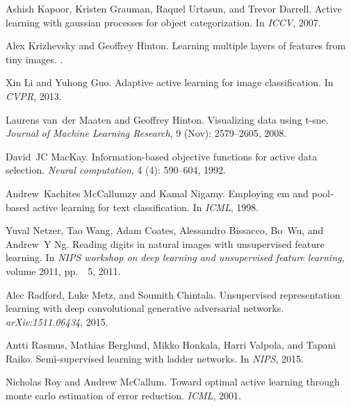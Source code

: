 \documentclass{article} %
\begin{document}
\begin{thebibliography}{51}
Ashish Kapoor, Kristen Grauman, Raquel Urtasun, and Trevor Darrell.
\newblock Active learning with gaussian processes for object categorization.
\newblock In \emph{ICCV}, 2007.

Alex Krizhevsky and Geoffrey Hinton.
\newblock Learning multiple layers of features from tiny images.
.

Xin Li and Yuhong Guo.
\newblock Adaptive active learning for image classification.
\newblock In \emph{CVPR}, 2013.

Laurens van~der Maaten and Geoffrey Hinton.
\newblock Visualizing data using t-sne.
\newblock \emph{Journal of Machine Learning Research}, 9
  (Nov): 2579--2605, 2008.

David~JC MacKay.
\newblock Information-based objective functions for active data selection.
\newblock \emph{Neural computation}, 4 (4): 590--604, 1992.

Andrew~Kachites McCallumzy and Kamal Nigamy.
\newblock Employing em and pool-based active learning for text classification.
\newblock In \emph{ICML}, 1998.

Yuval Netzer, Tao Wang, Adam Coates, Alessandro Bissacco, Bo~Wu, and Andrew~Y
  Ng.
\newblock Reading digits in natural images with unsupervised feature learning.
\newblock In \emph{NIPS workshop on deep learning and unsupervised feature
  learning}, volume 2011, pp.\ ~5, 2011.

Alec Radford, Luke Metz, and Soumith Chintala.
\newblock Unsupervised representation learning with deep convolutional
  generative adversarial networks.
\newblock \emph{arXiv:1511.06434}, 2015.

Antti Rasmus, Mathias Berglund, Mikko Honkala, Harri Valpola, and Tapani Raiko.
\newblock Semi-supervised learning with ladder networks.
\newblock In \emph{NIPS}, 2015.

Nicholas Roy and Andrew McCallum.
\newblock Toward optimal active learning through monte carlo estimation of
  error reduction.
\newblock \emph{ICML}, 2001.


\end{thebibliography}
\end{document}
